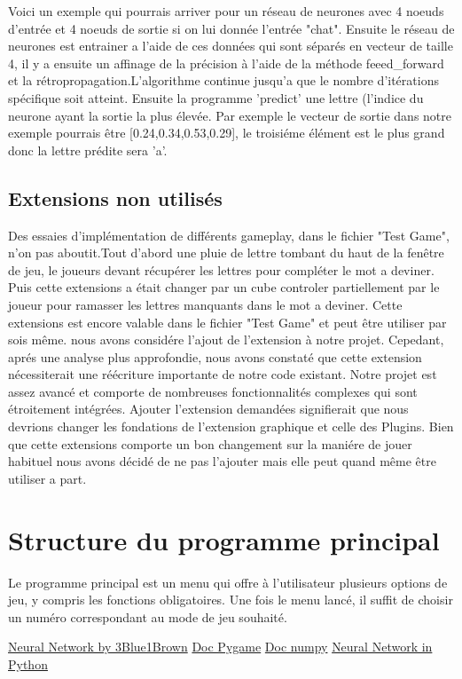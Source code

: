 \documentclass{article}
\def\abc#1{\begingroup\escapechar-1 \expandafter\string\csname#1\endcsname\endgroup}
\begin{document}
Voici un exemple qui pourrais arriver pour un réseau de neurones avec 4 noeuds d'entrée et 4 noeuds de sortie si on lui donnée l'entrée "chat".
Ensuite le réseau de neurones est entrainer a l'aide de ces données qui sont séparés en vecteur de taille 4, il y a ensuite un affinage de la précision à l'aide de la méthode \abc{feeed_forward} et la rétropropagation.L'algorithme continue jusqu'a que le nombre d'itérations spécifique soit atteint.
Ensuite la programme 'predict' une lettre (l'indice du neurone ayant la sortie la plus élevée. Par exemple le vecteur de sortie dans notre exemple pourrais être [0.24,0.34,0.53,0.29], le troisiéme élément est le plus grand donc la lettre prédite sera 'a'.

\subsection{Extensions non utilisés}
Des essaies d'implémentation de différents gameplay, dans le fichier "Test Game", n'on pas aboutit.Tout d'abord une pluie de lettre tombant du haut de la fenêtre de jeu, le joueurs devant récupérer les lettres pour compléter le mot a deviner.
Puis cette extensions a était changer par un cube controler partiellement par le joueur pour ramasser les lettres manquants dans le mot a deviner.
Cette extensions est encore valable dans le fichier "Test Game" et peut être utiliser par sois même.
nous avons considére l'ajout de l'extension à notre projet. Cepedant, aprés une analyse plus approfondie, nous avons constaté que cette extension nécessiterait une réécriture importante de notre code existant.
Notre projet est assez avancé et comporte de nombreuses fonctionnalités complexes qui sont étroitement intégrées. Ajouter l'extension demandées signifierait que nous devrions changer les fondations de l'extension graphique et celle des Plugins.
Bien que cette extensions comporte un bon changement sur la maniére de jouer habituel nous avons décidé de ne pas l'ajouter mais elle peut quand même être utiliser a part.

\section{Structure du programme principal}

Le programme principal est un menu qui offre à l'utilisateur plusieurs options de jeu, y compris les fonctions obligatoires. Une fois le menu lancé, il suffit de choisir un numéro correspondant au mode de jeu souhaité.


\begin{thebibliography}{1}
\href{https://youtube.com/playlist?list=PLZHQObOWTQDNU6R1_67000Dx_ZCJB-3pi}{Neural Network by 3Blue1Brown}
\href{https://www.pygame.org/docs/}{Doc Pygame}
\href{https://numpy.org/doc/}{Doc numpy} 
\href{https://medium.datadriveninvestor.com/building-a-neural-network-from-scratch-using-python-1c143cb30f61}{Neural Network in Python} 
\end{thebibliography}
\end{document}
